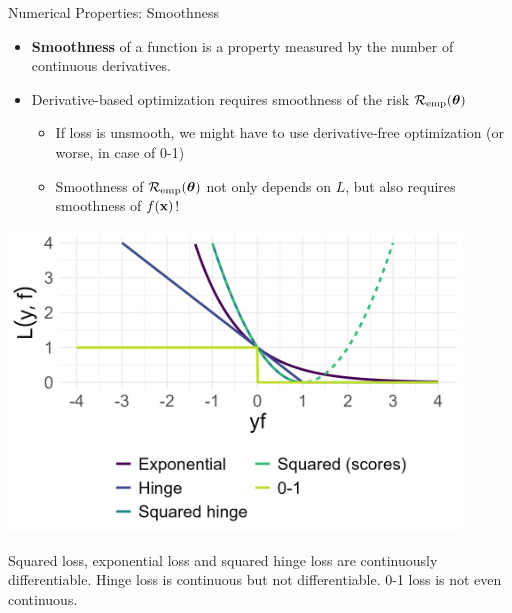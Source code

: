 \documentclass[11pt,compress,t,notes=noshow, xcolor=table]{beamer}
\begin{document}

\begin{vbframe}{Numerical Properties: Smoothness}


\begin{itemize}
  \small
  \item \textbf{Smoothness} of a function is a property measured by 
  the number of continuous derivatives. 
  \item Derivative-based optimization requires smoothness of the 
  risk $\mathcal{R}_{\text{emp}}(\bm{\theta})$ 
  \begin{itemize}
    \small
    \item If loss is unsmooth, we might have to use derivative-free optimization (or worse, in case of 0-1)
    \item Smoothness of $\mathcal{R}_{\text{emp}}(\bm{\theta})$ not only depends on $L$, but also requires smoothness of $f(\mathbf{x})$! 
  \end{itemize}
\end{itemize}

\vfill

\begin{minipage}[c]{0.4\textwidth}
  \includegraphics[width=0.9\textwidth]{figure/overview_classif.png}
\end{minipage}%
\begin{minipage}[c]{0.05\textwidth}
  \phantom{foo}
\end{minipage}%
\begin{minipage}[c]{0.55\textwidth}
  \footnotesize \raggedright
  Squared loss, exponential loss and squared hinge loss are continuously 
  differentiable. Hinge loss is continuous but not differentiable. 
  0-1 loss is not even continuous.
\end{minipage}%


\end{vbframe}
\end{document}

